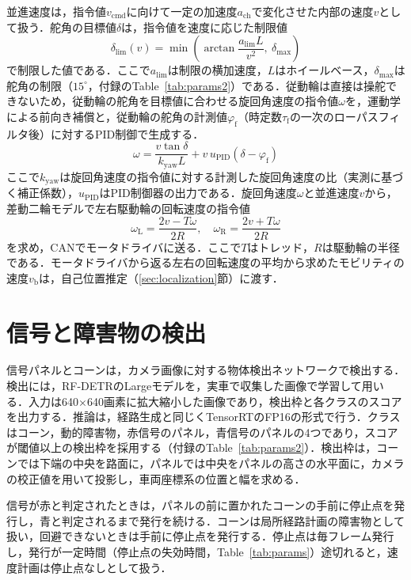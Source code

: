 並進速度は，指令値$v_{\mathrm{cmd}}$に向けて一定の加速度$a_{\mathrm{ch}}$で変化させた内部の速度$v$として扱う．舵角の目標値$\delta$は，指令値を速度に応じた制限値
\begin{equation}
  \delta_{\mathrm{lim}}(v) = \min\!\left(\arctan\frac{a_{\mathrm{lim}} L}{v^2},\ \delta_{\max}\right)
  \label{eq:steerlimit}
\end{equation}
で制限した値である．ここで$a_{\mathrm{lim}}$は制限の横加速度，$L$はホイールベース，$\delta_{\max}$は舵角の制限（$15^\circ$，付録のTable~\ref{tab:params2}）である．従動輪は直接は操舵できないため，従動輪の舵角を目標値に合わせる旋回角速度の指令値$\omega$を，運動学による前向き補償と，従動輪の舵角の計測値$\varphi_{\mathrm{f}}$（時定数$\tau_{\mathrm{f}}$の一次のローパスフィルタ後）に対するPID制御で生成する．
\begin{equation}
  \omega = \frac{v\tan\delta}{k_{\mathrm{yaw}}L} + v\,u_{\mathrm{PID}}(\delta-\varphi_{\mathrm{f}})
  \label{eq:yawcmd}
\end{equation}
ここで$k_{\mathrm{yaw}}$は旋回角速度の指令値に対する計測した旋回角速度の比（実測に基づく補正係数），$u_{\mathrm{PID}}$はPID制御器の出力である．旋回角速度$\omega$と並進速度$v$から，差動二輪モデルで左右駆動輪の回転速度の指令値
\begin{equation}
  \omega_{\mathrm{L}} = \frac{2v - T\omega}{2R},\quad \omega_{\mathrm{R}} = \frac{2v + T\omega}{2R}
  \label{eq:wheelspeed}
\end{equation}
を求め，CANでモータドライバに送る．ここで$T$はトレッド，$R$は駆動輪の半径である．モータドライバから返る左右の回転速度の平均から求めたモビリティの速度$v_{\mathrm{b}}$は，自己位置推定（\ref{sec:localization}節）に渡す．

\section{信号と障害物の検出}
\label{sec:perception}
信号パネルとコーンは，カメラ画像に対する物体検出ネットワークで検出する．検出には，RF-DETR\cite{rfdetr2025}のLargeモデルを，実車で収集した画像で学習して用いる．入力は640$\times$640画素に拡大縮小した画像であり，検出枠と各クラスのスコアを出力する．推論は，経路生成と同じくTensorRTのFP16の形式で行う．クラスはコーン，動的障害物，赤信号のパネル，青信号のパネルの4つであり，スコアが閾値以上の検出枠を採用する（付録のTable~\ref{tab:params2}）．検出枠は，コーンでは下端の中央を路面に，パネルでは中央をパネルの高さの水平面に，カメラの校正値を用いて投影し，車両座標系の位置と幅を求める．

信号が赤と判定されたときは，パネルの前に置かれたコーンの手前に停止点を発行し，青と判定されるまで発行を続ける．コーンは局所経路計画の障害物として扱い，回避できないときは手前に停止点を発行する．停止点は毎フレーム発行し，発行が一定時間（停止点の失効時間，Table~\ref{tab:params}）途切れると，速度計画は停止点なしとして扱う．


